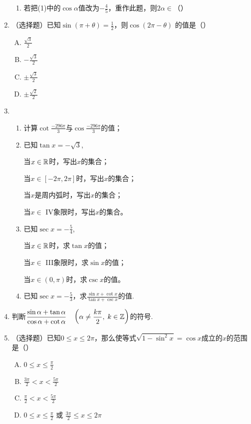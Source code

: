 \begin{enumerate}
\begin{enumerate}[(1)]
\item 若把(1)中的$\cos\alpha$值改为$-\frac{4}{5}$，重作此题，则$2\alpha\in$（\qquad）
\end{enumerate}

\item （选择题）已知$\sin(\pi+\theta)=\frac{1}{2}$，则$\cos(2\pi-\theta)$
的值是\hfill（\qquad）
\begin{multicols}{4}
    \begin{enumerate}[(A)]
        \item $\frac{\sqrt{3}}{2}$
        \item $-\frac{\sqrt{3}}{2}$
        \item $\pm\frac{\sqrt{3}}{2}$
        \item $\pm\frac{\sqrt{2}}{2}$
    \end{enumerate}
    \end{multicols}

\item \begin{enumerate}[(1)]
    \item 计算$\cot\frac{-296\pi}{3}$与$\cos\frac{-296\pi}{3}$的值；
 \item    已知$\tan x=-\sqrt{3}$, 
    
 当$x\in\mathbb{R}$时，写出$x$的集合；

    当$x\in[-2\pi, 2\pi]$时，写出$x$的集合；

    当$x$是周内弧时，写出$x$的集合；

    当$x\in$ IV象限时，写出$x$的集合。
    \item 已知$\sec x=-\frac{5}{4}$,
    
    当$x\in\mathbb{R}$时，求$\tan x$的值；

    当$x\in $ III象限时，求$\sin x$的值；
    
    当$x\in (0,\pi)$时，求$\csc x$的值。
    
    \item    已知$\sec x=-\frac{5}{3}$，求$\frac{\sin x+\cot x}{\tan x+\csc x}$的值.
\end{enumerate}

\item 判断$\dfrac{\sin\alpha+\tan\alpha}{\cos\alpha+\cot\alpha}\quad \left(\alpha\ne \dfrac{k\pi}{2},\; k\in\mathbb{Z}\right)$的符号.
\item （选择题）已知$0\le x\le 2\pi$，那么使等式$\sqrt{1-\sin^2 x}=\cos x$成立的$x$的范围是\hfill（\qquad）
\begin{multicols}{2}
\begin{enumerate}[(A)]
    \item $0\le x\le \frac{\pi}{2} $
    \item $\frac{3\pi}{2}<x<\frac{5\pi}{2}$
    \item $\frac{\pi}{2}<x<\frac{5\pi}{2}$
    \item $0\le x\le \frac{\pi}{2}$ 或 $\frac{3\pi}{2}\le x\le 2\pi$
\end{enumerate}
\end{multicols}
\end{enumerate}

